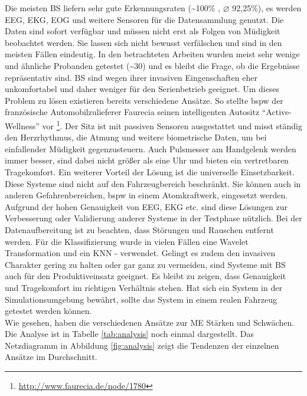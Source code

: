 {Die meisten \acl{BS} liefern sehr gute Erkennungsraten  (\textasciitilde 100\% \cite{zhang_6513058}, $\varnothing$ 92,25\%), es werden EEG, EKG, EOG und weitere Sensoren für die Datensammlung genutzt. Die Daten sind sofort verfügbar und müssen nicht erst als Folgen von Müdigkeit beobachtet werden. Sie lassen sich nicht bewusst verfälschen und sind in den meisten Fällen eindeutig. In den betrachteten Arbeiten wurden meist sehr wenige und ähnliche Probanden getestet (\textasciitilde 30) und es bleibt die Frage, ob die Ergebnisse repräsentativ sind. \acl{BS} sind wegen ihrer invasiven Eingenschaften eher unkomfortabel und daher weniger für den Serienbetrieb geeignet. Um dieses Problem zu lösen existieren bereits verschiedene Ansätze. So stellte \acl{bspw} der französische Automobilzulieferer Faurecia seinen intelligenten Autositz "`Active-Wellness"' vor \footnote{\url{http://www.faurecia.de/node/1780}}. Der Sitz ist mit passiven Sensoren ausgestattet und misst ständig den Herzrhythmus, die Atmung und weitere biometrische Daten, um bei einfallender Müdigkeit gegenzusteuern. Auch Pulsmesser am Handgelenk werden immer besser, sind dabei nicht größer als eine Uhr und bieten ein vertretbaren Tragekomfort. 
Ein weiterer Vorteil der Lösung ist die universelle Einsetzbarkeit. Diese Systeme sind nicht auf den Fahrzeugbereich beschränkt. Sie können auch in anderen Gefahrenbereichen, \acl{bspw} in einem Atomkraftwerk, eingesetzt werden. Aufgrund der hohen Genauigkeit von EEG, EKG etc. sind diese Lösungen zur Verbesserung oder Validierung anderer Systeme in der Testphase nützlich.
Bei der Datenaufbereitung ist zu beachten, dass Störungen und Rauschen entfernt werden. Für die Klassifizierung wurde in vielen Fällen eine Wavelet Transformation \cite{zhang_6513058}\cite{Khushaba_5580017}\cite{Subasi:2005:ARA:1707423.1707550} und ein KNN \cite{wilson_890161} - \cite{Murthy_1} verwendet. Gelingt es zudem den invasiven Charakter gering zu halten oder gar ganz zu vermeiden, sind Systeme mit \acl{BS} auch für den Produktiveinsatz geeignet. Es bleibt zu zeigen, dass Genauigkeit und Tragekomfort im richtigen Verhältnis stehen. Hat sich ein System in der Simulationsumgebung bewährt, sollte das System in einem realen Fahrzeug getestet werden können.  \\

Wie gesehen, haben die verschiedenen Ansätze zur \acl{ME} Stärken und Schwächen. Die Analyse ist in Tabelle \ref{tab:analysis} noch einmal dargestellt. Das Netzdiagramm in Abbildung \ref{fig:analysis} zeigt die Tendenzen der einzelnen Ansätze im Durchschnitt.


}
